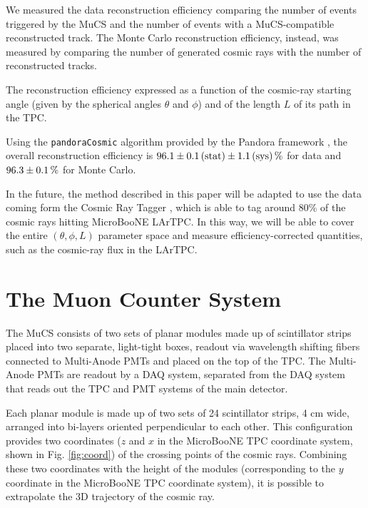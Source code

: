 \documentclass[a4paper]{scrartcl}
\begin{document}
We measured the data reconstruction efficiency comparing the number of events triggered by the MuCS and the number of events with a MuCS-compatible reconstructed track.
The Monte Carlo reconstruction efficiency, instead, was measured by comparing the number of generated cosmic rays with the number of reconstructed tracks.

The reconstruction efficiency expressed as a function of the cosmic-ray starting angle (given by the spherical angles $\theta$ and $\phi$) and of the length $L$ of its path in the TPC.

Using the \texttt{pan\-do\-ra\-Co\-smic} algorithm \cite{pandoracosmic} provided by the Pandora framework \cite{pandora}, the overall reconstruction efficiency is $96.1\pm0.1\thinspace(\mathrm{stat}) \pm 1.1\thinspace(\mathrm{sys})\thinspace\%$ for data and $96.3\pm0.1\thinspace\%$ for Monte Carlo.

In the future, the method described in this paper will be adapted to use the data coming form the Cosmic Ray Tagger \cite{crt}, which is able to tag around 80\% of the cosmic rays hitting MicroBooNE LArTPC. In this way, we will be able to cover the entire $(\theta,\phi,L)$ parameter space and measure efficiency-corrected quantities, such as the cosmic-ray flux in the LArTPC.

\section{The Muon Counter System}\label{sec:proc}
The MuCS consists of two sets of planar modules made up of scintillator strips placed into two separate, light-tight boxes, readout via wavelength shifting fibers connected to Multi-Anode PMTs and placed on the top of the TPC. The Multi-Anode PMTs are readout by a DAQ system, separated from the DAQ system that reads out the TPC and PMT systems of the main detector.

Each planar module is made up of two sets of 24 scintillator strips, 4 cm wide, arranged into bi-layers oriented perpendicular to each other. This configuration provides two coordinates ($z$ and $x$ in the MicroBooNE TPC coordinate system, shown in Fig. \ref{fig:coord}) of the crossing points of the cosmic rays. Combining these two coordinates with the height of the modules (corresponding to the $y$ coordinate in the MicroBooNE TPC coordinate system), it is possible to extrapolate the 3D trajectory of the cosmic ray.
\end{document}
